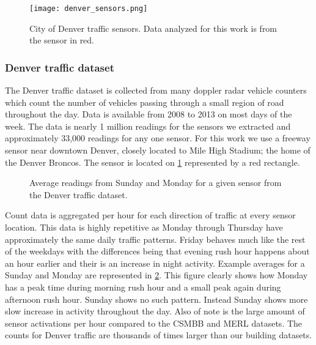 \begin{figure}[!b]
	\begin{center}
		\texttt{[image: denver\_sensors.png]}
	\end{center}
	\caption{City of Denver traffic sensors.  Data analyzed for this work is from the sensor in red.}
	\label{fig:denvertraffic}
\end{figure}

\subsubsection{Denver traffic dataset}
The Denver traffic dataset is collected from many doppler radar vehicle counters which count the number of vehicles passing through a small region of road throughout the day.  Data is available from 2008 to 2013 on most days of the week.  The data is nearly 1 million readings for the sensors we extracted and approximately 33,000 readings for any one sensor.  For this work we use a freeway sensor near downtown Denver, closely located to Mile High Stadium; the home of the Denver Broncos.  The sensor is located on \ref{fig:denvertraffic} represented by a red rectangle.

\begin{figure}[t]
	\begin{center}
	\end{center}
	\caption{Average readings from Sunday and Monday for a given sensor from the Denver traffic dataset.}
	\label{fig:denver_day_raw}
\end{figure}

Count data is aggregated per hour for each direction of traffic at every sensor location.  This data is highly repetitive as Monday through Thursday have approximately the same daily traffic patterns.  Friday behaves much like the rest of the weekdays with the differences being that evening rush hour happens about an hour earlier and their is an increase in night activity.   Example averages for a Sunday and Monday are represented in \ref{fig:denver_day_raw}.  This figure clearly shows how Monday has a peak time during morning rush hour and a small peak again during afternoon rush hour.  Sunday shows no such pattern.  Instead Sunday shows more slow increase in activity throughout the day.  Also of note is the large amount of sensor activations per hour compared to the CSMBB and MERL datasets.  The counts for Denver traffic are thousands of times larger than our building datasets.

